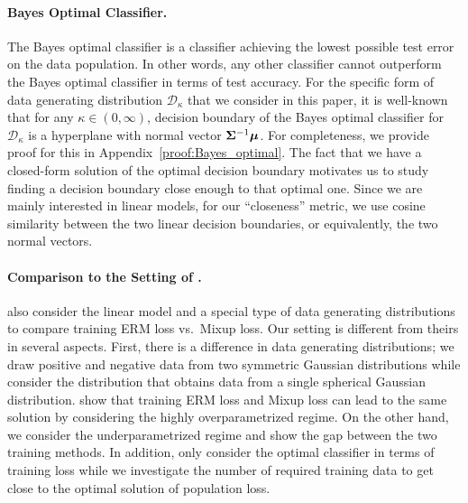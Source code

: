 \paragraph{Bayes Optimal Classifier.}
The Bayes optimal classifier is a classifier achieving the lowest possible test error on the data population. In other words, any other classifier cannot outperform the Bayes optimal classifier in terms of test accuracy. 
For the specific form of data generating distribution $\mathcal{D}_\kappa$ that we consider in this paper, it is well-known that for any $\kappa \in (0,\infty)$, decision boundary of the Bayes optimal classifier for $\mathcal{D}_\kappa$ is a hyperplane with normal vector ${\bm{\Sigma}}^{-1} {\bm{\mu}}$. For completeness, we provide proof for this in Appendix~\ref{proof:Bayes_optimal}. The fact that we have a closed-form solution of the optimal decision boundary motivates us to study finding a decision boundary close enough to that optimal one. Since we are mainly interested in linear models, for our ``closeness'' metric, we use cosine similarity between the two linear decision boundaries, or equivalently, the two normal vectors.

\paragraph{Comparison to the Setting of \citet{chidambaram2021towards}.}
\citet{chidambaram2021towards} also consider the linear model and a special type of data generating distributions to compare training ERM loss vs.\ Mixup loss. Our setting is different from theirs in several aspects. First, there is a difference in data generating distributions; we draw positive and negative data from two symmetric Gaussian distributions while \citet{chidambaram2021towards} consider the distribution that obtains data from a single spherical Gaussian distribution. \citet{chidambaram2021towards} show that training ERM loss and Mixup loss can lead to the same solution by considering the highly overparametrized regime. On the other hand, we consider the underparametrized regime and show the gap between the two training methods. In addition, \citet{chidambaram2021towards} only consider the optimal classifier in terms of training loss while we investigate the number of required training data to get close to the optimal solution of population loss.

